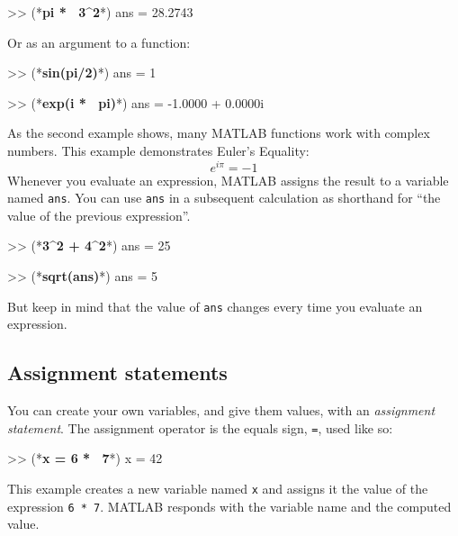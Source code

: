 \begin{code}
>> (*\textbf{pi * ~3\^{}2}*)
ans = 28.2743
\end{code}

Or as an argument to a function:

\begin{code}
>> (*\textbf{sin(pi/2)}*)
ans = 1

>> (*\textbf{exp(i * ~pi)}*)
ans = -1.0000 + 0.0000i
\end{code}


As the second example shows, many MATLAB functions work with
complex numbers.  This example demonstrates Euler's Equality:
%
\begin{equation*}
e^{i \pi} = -1
\end{equation*}
%
Whenever you evaluate an expression, MATLAB assigns the result to
a variable named \lstinline{ans}.  You can use \lstinline{ans} in a subsequent
calculation as shorthand for ``the value of the previous expression''.

\begin{code}
>> (*\textbf{3\^{}2 + 4\^{}2}*)
ans = 25

>> (*\textbf{sqrt(ans)}*)
ans = 5
\end{code}

But keep in mind that the value of \lstinline{ans} changes every time
you evaluate an expression.


\subsection{Assignment statements}

You can create your own variables, and give them values, with
an \emph{assignment statement}.  The assignment operator is the
equals sign, \lstinline{=}, used like so:


\begin{code}
>> (*\textbf{x = 6 * ~7}*)
x = 42
\end{code}

This example creates a new variable named \lstinline{x} and assigns it the
value of the expression \lstinline{6 * 7}.  MATLAB responds with the
variable name and the computed value.


